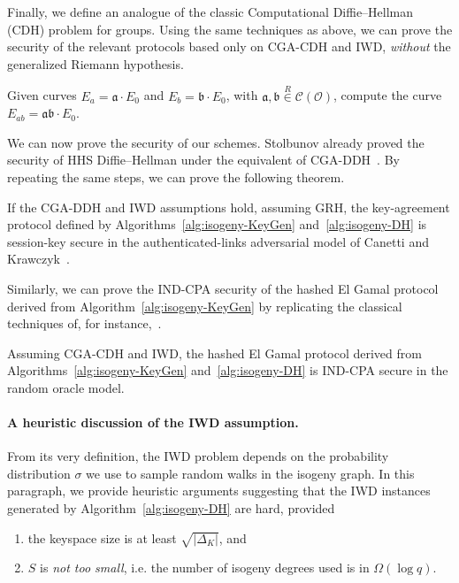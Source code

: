 \documentclass{llncs}
\newcommand{\Cl}{\mathcal{C}}
\renewcommand{\O}{\mathcal{O}}
\renewcommand{\frak}{\mathfrak}
\newcommand{\rand}[1]{\overset{#1}{∈}}
\newcommand{\uni}{\rand{R}}
\begin{document}
Finally, we define an analogue of the classic 
Computational Diffie--Hellman (CDH) problem for groups.
Using the same techniques as above, we can prove the
security of the relevant protocols based only on CGA-CDH and IWD,
\emph{without} the generalized Riemann hypothesis.

\begin{definition}
  Given curves $E_a=\frak a·E_0$ and $E_b=\frak b·E_0$, with
  $\frak a,\frak b\uni\Cl(\O)$, compute the curve
  $E_{ab}=\frak{ab}·E_0$.
\end{definition}

We can now prove the security of our schemes. Stolbunov already proved
the security of HHS Diffie--Hellman under the equivalent of CGA-DDH~\cite{Stol}.
By repeating the same steps, we can prove the following theorem.

\begin{theorem}
    If the CGA-DDH and IWD assumptions hold, assuming GRH, 
    the key-agreement protocol defined by 
    Algorithms~\ref{alg:isogeny-KeyGen} and~\ref{alg:isogeny-DH}
    is session-key secure in the authenticated-links adversarial model 
    of Canetti and Krawczyk~\cite{canetti}.
\end{theorem}

Similarly, we can prove the IND-CPA security of the hashed El Gamal
protocol derived from Algorithm~\ref{alg:isogeny-KeyGen} by replicating the
classical techniques of, for
instance,~\cite[20.4.11]{galbraith2012mathematics}.

\begin{theorem}
    Assuming CGA-CDH and IWD, the hashed El Gamal protocol derived from
    Algorithms~\ref{alg:isogeny-KeyGen} and~\ref{alg:isogeny-DH}
    is IND-CPA secure in the random oracle model.
\end{theorem}


\paragraph{A heuristic discussion of the IWD assumption.}

From its very definition, the IWD problem depends on
the probability distribution $σ$ we use to sample
random walks in the isogeny graph. In this paragraph,
we provide heuristic arguments suggesting that 
the IWD instances generated by Algorithm~\ref{alg:isogeny-DH} are hard,
provided
\begin{enumerate}
    \item the keyspace size is at least $\sqrt{|Δ_K|}$, and
    \item $S$ is \emph{not too small}, i.e. the number of
        isogeny degrees used is in $\Omega(\log q)$.
\end{enumerate}
\end{document}
